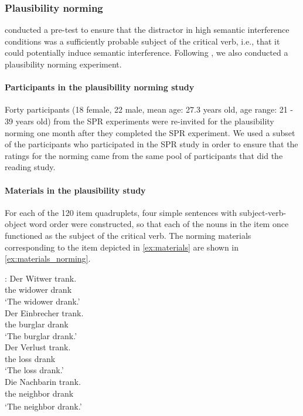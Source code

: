 \documentclass[a4paper, man, floatsintext]{apa7}
\begin{document}
\subsubsection{Plausibility norming}
\citeauthor{vandyke07} conducted a pre-test to ensure that the distractor in high semantic interference conditions was a sufficiently probable subject of the critical verb, i.e., that it could potentially induce semantic interference. Following \citeauthor{vandyke07}, we also conducted a plausibility norming experiment.

\paragraph{Participants in the plausibility norming study}
Forty participants (18 female, 22 male, mean age: 27.3 years old, age range: 21 - 39 years old) from the SPR experiments were re-invited for the plausibility norming one month after they completed the SPR experiment. We used a subset of the participants who participated in the SPR study in order to ensure that the ratings for the norming came from the same pool of participants that did the reading study.

\paragraph{Materials in the plausibility study}
For each of the 120 item quadruplets, four simple sentences with subject-verb-object word order were constructed, so that each of the nouns in the item once functioned as the subject of the critical verb. The norming materials corresponding to the item depicted in \ref{ex:materials} are shown in \ref{ex:materials_norming}.

\begin{exe}  
\ex \label{ex:materials_norming}
    \begin{xlist}   
    :\label{ex:subject} 
    \gll Der Witwer trank. \\ 
    the widower drank\\
    \trans  `The widower drank.'\\  
    \label{ex:animate_dist} 
    \gll Der Einbrecher trank. \\ 
    the burglar drank \\
    \trans `The burglar drank.' \\
   \label{ex:inanimate_dist} 
    \gll Der Verlust trank.  \\ 
    the loss drank\\
    \trans  `The loss drank.'\\  
    \label{ex:intro_noun} 
    \gll Die Nachbarin trank.\\ 
    the\textsubscript{} neighbor\textsubscript{} drank \\
    \trans `The neighbor drank.' \\
    \end{xlist}
\end{exe}
\end{document}
